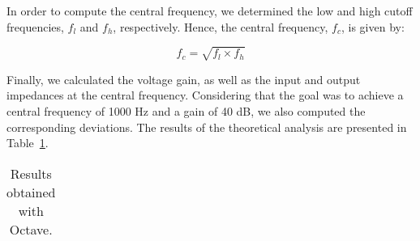 \vspace{4mm}

In order to compute the central frequency, we determined the low and high cutoff frequencies, $f_l$ and $f_h$, respectively. Hence, the central frequency, $f_c$, is given by:

\begin{equation}
f_c=\sqrt{f_l\times f_h}
\end{equation}

Finally, we calculated the voltage gain, as well as the input and output impedances at the central frequency. Considering that the goal was to achieve a central frequency of 1000 Hz and a gain of 40 dB, we also computed the corresponding deviations. The results of the theoretical analysis are presented in Table~\ref{tab:resultsteo}.

\begin{table}[H]
  \centering
  \begin{tabular}{|l|r|}
    \hline    
    
  \end{tabular}
  \caption{Results obtained with Octave.}
  \label{tab:resultsteo}
\end{table}

